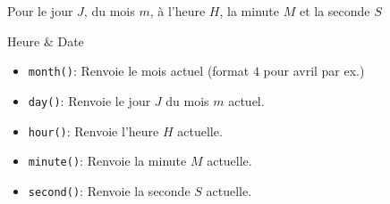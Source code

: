 \documentclass[a4paper, 8pt]{article}
\theoremstyle{definition}
\begin{document}


Pour le jour $J$, du mois $m$, à l'heure $H$, la minute $M$ et la seconde $S$
\begin{bclogo}[logo = \bccrayon, arrondi = 0.1, noborder = true]{\textcolor{redStruc}{Heure $\&$ Date}}
\begin{itemize}[font= \color{redStruc} \small , label = \textbullet ]
\item \texttt{month()}: Renvoie le mois actuel (format $4$ pour avril par ex.)
\item \texttt{day()}: Renvoie le jour $J$ du mois $m$ actuel.
\item \texttt{hour()}: Renvoie l'heure $H$ actuelle.
\item \texttt{minute()}: Renvoie la minute $M$ actuelle.
\item \texttt{second()}: Renvoie la seconde $S$ actuelle.
\end{itemize} 
\end{bclogo}
\end{document}
